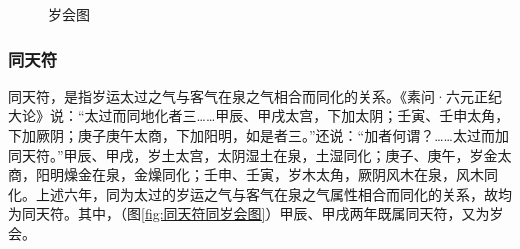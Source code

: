 \documentclass[12pt]{ctexbook}
\begin{document}
\begin{figure}[htb]%
  \centering
  \caption{岁会图}\label{fig:岁会图}
\end{figure}

\subsubsection{同天符}%

同天符，是指岁运太过之气与客气在泉之气相合而同化的关系。《素问·六元正纪大论》说：“太过而同地化者三……甲辰、甲戌太宫，下加太阴；壬寅、壬申太角，下加厥阴；庚子庚午太商，下加阳明，如是者三。”还说：“加者何谓？……太过而加同天符。”甲辰、甲戌，岁土太宫，太阴湿土在泉，土湿同化；庚子、庚午，岁金太商，阳明燥金在泉，金燥同化；壬申、壬寅，岁木太角，厥阴风木在泉，风木同化。上述六年，同为太过的岁运之气与客气在泉之气属性相合而同化的关系，故均为同天符。其中，（图\ref{fig:同天符同岁会图}）甲辰、甲戌两年既属同天符，又为岁会。

\end{document}
